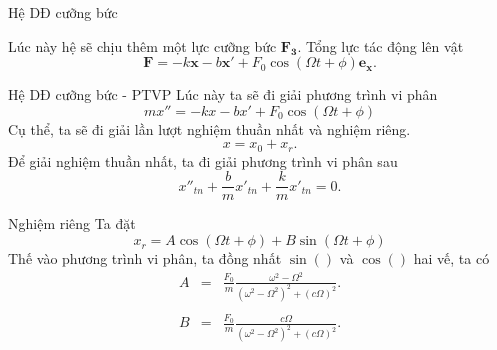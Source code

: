 \begin{frame}{Hệ DĐ cưỡng bức}
    \begin{center}
        \resizebox{0.7\linewidth}{!}{}
    \end{center}
    Lúc này hệ sẽ chịu thêm một lực cưỡng bức \(\mathbf{F_3}\). Tổng lực tác động lên vật
    \begin{equation}
        \displaystyle \mathbf{F} =  - k \mathbf{x} - b \mathbf{x'} + F_0 \cos{(\Omega t + \phi)} \mathbf{e_x}.
        \label{eq:2.3_1}
    \end{equation}
\end{frame}
\begin{frame}{Hệ DĐ cưỡng bức - PTVP}
    Lúc này ta sẽ đi giải phương trình vi phân
    \begin{equation}
        mx'' = -kx -bx' + F_0 \cos{(\Omega t + \phi)}
        \label{eq:2.3_2}
    \end{equation}
    Cụ thể, ta sẽ đi giải lần lượt nghiệm thuần nhất và nghiệm riêng.
    \begin{equation*}
        x = x_{0} + x_r.
    \end{equation*}
    Để giải nghiệm thuần nhất, ta đi giải phương trình vi phân sau
    \begin{equation*}
    x''_{tn} + {\displaystyle \frac{b}{m}} x'_{tn} + {\displaystyle \frac{k}{m}} x'_{tn} = 0.
    \end{equation*}
\end{frame}
\begin{frame}{Nghiệm riêng}
    Ta đặt
    \begin{equation*}
        x_r = A \cos{\left(\Omega t + \phi\right)} + B \sin{\left(\Omega t + \phi\right)}
    \end{equation*}
    Thế vào phương trình vi phân, ta đồng nhất \(\sin{()}\) và \(\cos{()}\) hai vế, ta có
    \begin{equation}
        \begin{array}{ccc}
        A &=& \displaystyle \frac{F_0}{m} \frac{\omega^2 - \Omega^2}{\left(\omega^2 - \Omega^2 \right)^2 + \left( c \Omega \right)^2}. 
        \\
        \\
        B &=& \displaystyle \frac{F_0}{m} \frac{c \Omega}{\left(\omega^2 - \Omega^2 \right)^2 + \left( c \Omega \right)^2}.
        \end{array}
        \label{eq:2.3_3}
    \end{equation}
\end{frame}